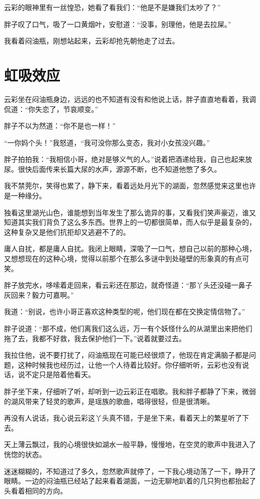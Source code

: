 云彩的眼神里有一丝惶恐，她看了看我们：“他是不是嫌我们太吵了？”

胖子叹了口气，吸了一口黄烟叶，安慰道：“没事，别理他，他是去拉屎。”

我看着闷油瓶，刚想站起来，云彩却抢先朝他走了过去。

\chapter{虹吸效应}

云彩坐在闷油瓶身边，远远的也不知道有没有和他说上话，胖子直直地看着，我调侃道：“你失恋了，节哀顺变。”

胖子不以为然道：“你不是也一样！”

“一你妈个头！”我怒道，“我可没你那么变态，我对小女孩没兴趣。”

胖子拍拍我：“我相信小哥，绝对是够义气的人。”说着把酒递给我，自己也起来放尿。很快后面传来长篇大尿的水声，源源不断，也不知道他憋了多久。

我不禁莞尔，笑得也累了，静下来，看着远处月光下的湖面，忽然感觉来这里也许是一种缘分。

独看这里湖光山色，谁能想到当年发生了那么诡异的事，又看我们笑声豪迈，谁又知道其实我们背负了这么多东西。世界上的一切都很简单，而人似乎是最复杂的，这种复杂又是他们抗拒却又逃避不了的。

庸人自扰，都是庸人自扰。我闭上眼睛，深吸了一口气，想自己以前的那种心境，又想想现在的这种心境，觉得以前那个在那么多谜中到处碰壁的形象真的有点可笑。

胖子放完水，哆嗦着走回来，看云彩还在那边，就奇怪道：“那丫头还没碰一鼻子灰回来？毅力可嘉啊。”

我道：“别说，也许小哥正喜欢这种类型的呢，他们现在都在交换定情信物了。”

胖子说道：“那不成，他们离我们这么远，万一有个妖怪什么的从湖里出来把他们拖了去，我都不好救，我去保护他们一下。”说着就要过去。

我拉住他，说不要打扰了，闷油瓶现在可能已经很烦了，他现在肯定满脑子都是问题，这种时候我也经历过，让他一个人待着比较好。你仔细听听，云彩也没有说话，说不定只是陪着他看天。

胖子坐下来，仔细听了听，却听到一边云彩正在唱歌。我和胖子都静了下来，微弱的湖风带来了轻灵的歌声，是瑶族的歌曲，唱得很轻，但是很清晰。

再没有人说话，我心说云彩这丫头真不错，于是坐下来，看着天上的繁星听了下去。

天上薄云飘过，我的心境很快如湖水一般平静，慢慢地，在空灵的歌声中我进入了恍惚的状态。

迷迷糊糊的，不知道过了多久，忽然歌声就停了，一下我心境动荡了一下，睁开了眼睛。一边的闷油瓶已经站了起来看着湖面，一边无聊地趴着的几只狗也都抬起了头看着相同的方向。

